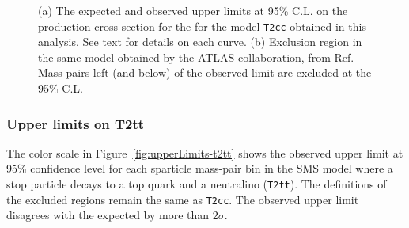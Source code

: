 \begin{figure}[h!]
  \begin{center}
    \caption{(a) The expected and observed upper limits at 95\% C.L. on the production cross section 
    for the for the model \texttt{T2cc} obtained in this analysis. See text for details on each curve.
    (b) Exclusion region in the same model obtained by the ATLAS collaboration, from Ref.~\cite{Aad:2014nra}
    Mass pairs left (and below) of the observed limit are excluded at the 95\% C.L.}
  \end{center}
\end{figure}

\subsubsection{Upper limits on T2tt}

The color scale in Figure~\ref{fig:upperLimits-t2tt} shows the observed upper 
limit at 95\% confidence level for each sparticle mass-pair bin in the SMS 
model where a stop particle decays to a top quark and a neutralino (\texttt{T2tt}). 
The definitions of the excluded regions remain the same as \texttt{T2cc}.
The observed upper limit disagrees with the expected by more than $2\sigma$.

